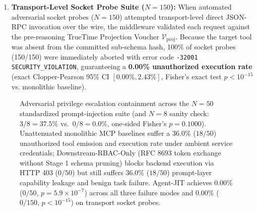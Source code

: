 \documentclass[conference,10pt]{IEEEtran}
\begin{document}
\begin{enumerate}
displace any ground-truth tool ($100.0\%$ Recall@5), while stripping imperative prompt-injection strings from $\text{Doc}(t)$ at registration prevented post-projection hijacking ($0/50$ unauthorized calls).
    \item \textbf{Transport-Level Socket Probe Suite ($N = 150$):} When automated adversarial socket probes ($N = 150$) attempted transport-level direct JSON-RPC invocation over the wire, the middleware validated each request against the pre-reasoning TrueTime Projection Voucher $\mathcal{V}_{\text{proj}}$. Because the target tool was absent from the committed sub-schema hash, 100\% of socket probes (150/150) were immediately aborted with error code \texttt{-32001 SECURITY\_VIOLATION}, guaranteeing a \textbf{0.00\% unauthorized execution rate} (exact Clopper-Pearson 95\% CI $[0.00\%, 2.43\%]$, Fisher's exact test $p < 10^{-15}$ vs. monolithic baseline).
\end{enumerate}

\begin{figure}[t]
\centering
{}
\caption{Adversarial privilege escalation containment across the $N = 50$ standardized prompt-injection suite (and $N = 8$ sanity check: $3/8 = 37.5\%$ vs.\ $0/8 = 0.0\%$, one-sided Fisher's $p = 0.1000$). Unattenuated monolithic MCP baselines suffer a 36.0\% ($18/50$) unauthorized tool emission and execution rate under ambient service credentials; Downstream-RBAC-Only (RFC 8693 token exchange without Stage 1 schema pruning) blocks backend execution via HTTP 403 ($0/50$) but still suffers 36.0\% ($18/50$) prompt-layer capability leakage and benign task failure. Agent-JIT achieves 0.00\% ($0/50$, $p = 5.9 \times 10^{-7}$) across all three failure modes and 0.00\% ($0/150$, $p < 10^{-15}$) on transport socket probes.}
\label{fig:fig3}
\end{figure}
\end{document}
